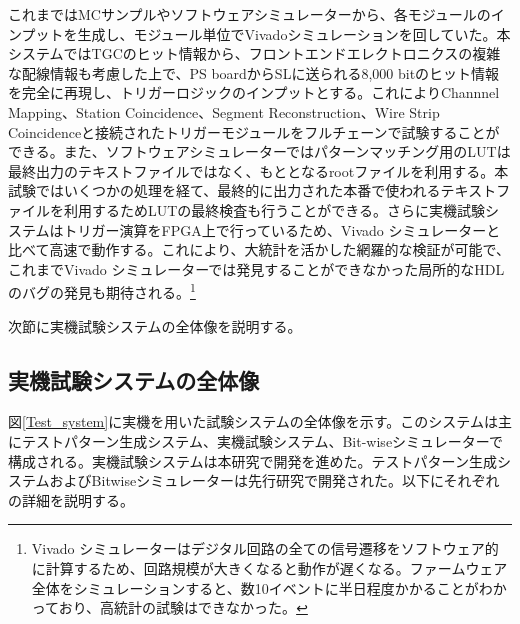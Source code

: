 これまではMCサンプルやソフトウェアシミュレーターから、各モジュールのインプットを生成し、モジュール単位でVivadoシミュレーションを回していた。本システムではTGCのヒット情報から、フロントエンドエレクトロニクスの複雑な配線情報も考慮した上で、PS boardからSLに送られる8,000 bitのヒット情報を完全に再現し、トリガーロジックのインプットとする。これによりChannnel Mapping、Station Coincidence、Segment Reconstruction、Wire Strip Coincidenceと接続されたトリガーモジュールをフルチェーンで試験することができる。また、ソフトウェアシミュレーターではパターンマッチング用のLUTは最終出力のテキストファイルではなく、もととなるrootファイルを利用する。本試験ではいくつかの処理を経て、最終的に出力された本番で使われるテキストファイルを利用するためLUTの最終検査も行うことができる。さらに実機試験システムはトリガー演算をFPGA上で行っているため、Vivado シミュレーターと比べて高速で動作する。これにより、大統計を活かした網羅的な検証が可能で、これまでVivado シミュレーターでは発見することができなかった局所的なHDLのバグの発見も期待される。\footnote{Vivado シミュレーターはデジタル回路の全ての信号遷移をソフトウェア的に計算するため、回路規模が大きくなると動作が遅くなる。ファームウェア全体をシミュレーションすると、数10イベントに半日程度かかることがわかっており、高統計の試験はできなかった。}

次節に実機試験システムの全体像を説明する。

\subsection{実機試験システムの全体像}
\label{subsec_TestSystemOverview}
図\ref{Test_system}に実機を用いた試験システムの全体像を示す。このシステムは主にテストパターン生成システム、実機試験システム、Bit-wiseシミュレーターで構成される。実機試験システムは本研究で開発を進めた。テストパターン生成システムおよびBitwiseシミュレーターは先行研究で開発された。以下にそれぞれの詳細を説明する。

